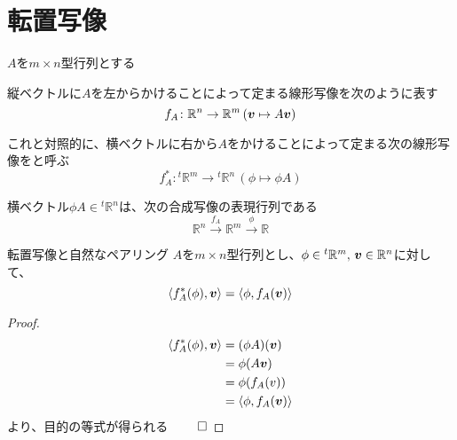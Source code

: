\documentclass[../../../topic_linear-algebra]{subfiles}
\begin{document}
\sectionline
\section{転置写像}

$A$を$m \times n$型行列とする

\br

縦ベクトルに$A$を左からかけることによって定まる線形写像を次のように表す
\begin{equation*}
  f_A \colon \mathbb{R}^n \to \mathbb{R}^m \, (\vb*{v} \mapsto A \vb*{v})
\end{equation*}

\br

これと対照的に、横ベクトルに右から$A$をかけることによって定まる次の線形写像をと呼ぶ
\begin{equation*}
  f_A^* \colon {}^t\mathbb{R}^m \to {}^t\mathbb{R}^n \, (\phi \mapsto \phi A)
\end{equation*}

\br

横ベクトル$\phi A \in {}^t\mathbb{R}^n$は、次の合成写像の表現行列である
\begin{equation*}
  \mathbb{R}^n \xrightarrow{f_A} \mathbb{R}^m \xrightarrow{\phi} \mathbb{R}
\end{equation*}

\br

\begin{theorem}{転置写像と自然なペアリング}
  $A$を$m \times n$型行列とし、$\phi \in {}^t\mathbb{R}^m,\,\vb*{v} \in \mathbb{R}^n$に対して、
  \begin{equation*}
    \langle f_A^*(\phi), \vb*{v} \rangle = \langle \phi, f_A(\vb*{v}) \rangle
  \end{equation*}
\end{theorem}

\begin{proof}
  \begin{align*}
    \langle f_A^*(\phi), \vb*{v} \rangle & = (\phi A)(\vb*{v})                  \\
                                         & = \phi(A \vb*{v})                    \\
                                         & = \phi(f_A \vb({v}))                 \\
                                         & = \langle \phi, f_A(\vb*{v}) \rangle
  \end{align*}
  より、目的の等式が得られる $\qed$
\end{proof}
\end{document}
